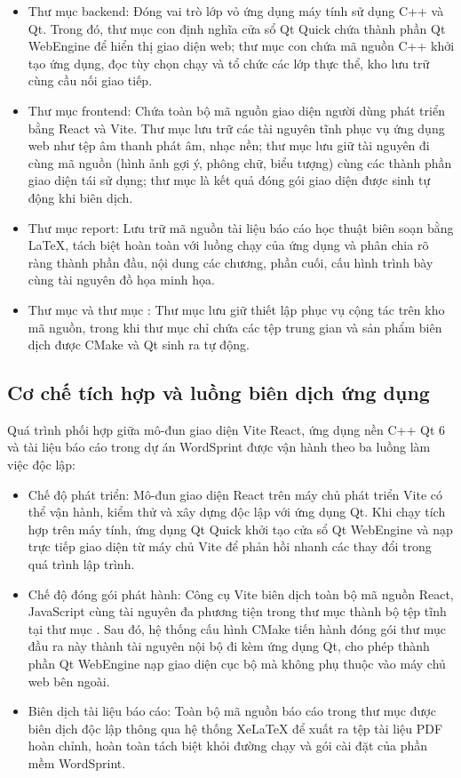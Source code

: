 \begin{itemize}
    \item Thư mục backend: Đóng vai trò lớp vỏ ứng dụng máy tính sử dụng C++ và Qt. Trong đó, thư mục con  định nghĩa cửa sổ Qt Quick chứa thành phần Qt WebEngine để hiển thị giao diện web; thư mục con  chứa mã nguồn C++ khởi tạo ứng dụng, đọc tùy chọn chạy và tổ chức các lớp thực thể, kho lưu trữ cùng cầu nối giao tiếp.
    \item Thư mục frontend: Chứa toàn bộ mã nguồn giao diện người dùng phát triển bằng React và Vite. Thư mục  lưu trữ các tài nguyên tĩnh phục vụ ứng dụng web như tệp âm thanh phát âm, nhạc nền; thư mục  lưu giữ tài nguyên đi cùng mã nguồn (hình ảnh gợi ý, phông chữ, biểu tượng) cùng các thành phần giao diện tái sử dụng; thư mục  là kết quả đóng gói giao diện được sinh tự động khi biên dịch.
    \item Thư mục report: Lưu trữ mã nguồn tài liệu báo cáo học thuật biên soạn bằng LaTeX, tách biệt hoàn toàn với luồng chạy của ứng dụng và phân chia rõ ràng thành phần đầu, nội dung các chương, phần cuối, cấu hình trình bày cùng tài nguyên đồ họa minh họa.
    \item Thư mục  và thư mục : Thư mục  lưu giữ thiết lập phục vụ cộng tác trên kho mã nguồn, trong khi thư mục  chỉ chứa các tệp trung gian và sản phẩm biên dịch được CMake và Qt sinh ra tự động.
\end{itemize}

\subsection{Cơ chế tích hợp và luồng biên dịch ứng dụng}
\label{subsec:integration_and_build_flow}
Quá trình phối hợp giữa mô-đun giao diện Vite React, ứng dụng nền C++ Qt 6 và tài liệu báo cáo trong dự án WordSprint được vận hành theo ba luồng làm việc độc lập:

\begin{itemize}
    \item Chế độ phát triển: Mô-đun giao diện React trên máy chủ phát triển Vite có thể vận hành, kiểm thử và xây dựng độc lập với ứng dụng Qt. Khi chạy tích hợp trên máy tính, ứng dụng Qt Quick khởi tạo cửa sổ Qt WebEngine và nạp trực tiếp giao diện từ máy chủ Vite để phản hồi nhanh các thay đổi trong quá trình lập trình.
    \item Chế độ đóng gói phát hành: Công cụ Vite biên dịch toàn bộ mã nguồn React, JavaScript cùng tài nguyên đa phương tiện trong thư mục  thành bộ tệp tĩnh tại thư mục . Sau đó, hệ thống cấu hình CMake tiến hành đóng gói thư mục đầu ra này thành tài nguyên nội bộ đi kèm ứng dụng Qt, cho phép thành phần Qt WebEngine nạp giao diện cục bộ mà không phụ thuộc vào máy chủ web bên ngoài.
    \item Biên dịch tài liệu báo cáo: Toàn bộ mã nguồn báo cáo trong thư mục  được biên dịch độc lập thông qua hệ thống XeLaTeX để xuất ra tệp tài liệu PDF hoàn chỉnh, hoàn toàn tách biệt khỏi đường chạy và gói cài đặt của phần mềm WordSprint.
\end{itemize}

